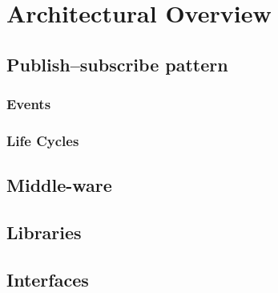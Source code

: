 \chapter{Architectural Overview}
\label{ch:architectural_overview}

\section{Publish–subscribe pattern}
\subsection{Events}
\subsection{Life Cycles}
% 

\section{Middle-ware}
\section{Libraries}
\section{Interfaces}
